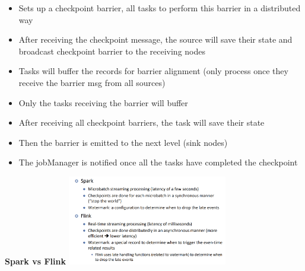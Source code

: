 \documentclass[10pt, landscape]{article}
\begin{document}
\begin{multicols}{4}
\begin{itemize}
\begin{itemize}
    \item Sets up a checkpoint barrier, all tasks to perform this barrier in a distributed way 
    \item After receiving the checkpoint message, the source will save their state and broadcast checkpoint barrier to the receiving nodes 
    \item Tasks will buffer the records for barrier alignment (only process once they receive the barrier msg from all sources)
    \item Only the tasks receiving the barrier will buffer
    \item After receiving all checkpoint barriers, the task will save their state
    \item Then the barrier is emitted to the next level (sink nodes)
    \item The jobManager is notified once all the tasks have completed the checkpoint 
  \end{itemize}
\end{itemize}

\textbf{Spark vs Flink}
\includegraphics*[width=7cm]{spark vs flink.png}



\end{multicols}
\end{document}
